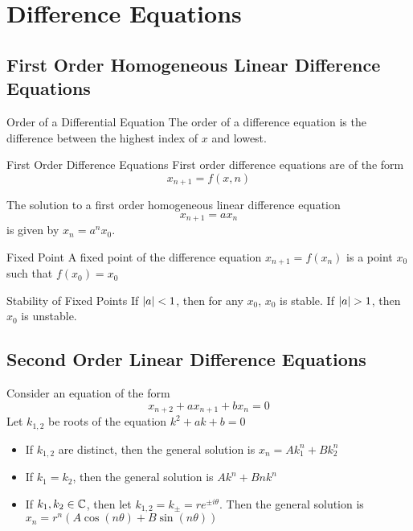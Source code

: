 \documentclass[a4paper]{article}
\begin{document}
\pagebreak
\section{Difference Equations}
\subsection{First Order Homogeneous Linear Difference Equations}
\begin{defn}{Order of a Differential Equation}{} The order of a difference equation is the difference between the highest index of $x$ and lowest. 
\end{defn}

\begin{defn}{First Order Difference Equations}{} First order difference equations are of the form $$x_{n+1}=f(x,n)$$
\end{defn}

\begin{thm}{}{} The solution to a first order homogeneous linear difference equation $$x_{n+1}=ax_n$$ is given by $x_n=a^nx_0$. 
\end{thm}

\begin{defn}{Fixed Point}{} A fixed point of the difference equation $x_{n+1}=f(x_n)$ is a point $x_0$ such that $f(x_0)=x_0$
\end{defn}

\begin{prp}{Stability of Fixed Points}{} If $\abs{a}<1$, then for any $x_0$, $x_0$ is stable. If $\abs{a}>1$, then $x_0$ is unstable. 
\end{prp}

\subsection{Second Order Linear Difference Equations}
\begin{thm}{}{} Consider an equation of the form $$x_{n+2}+ax_{n+1}+bx_n=0$$ Let $k_{1,2}$ be roots of the equation $k^2+ak+b=0$
\begin{itemize}
\item If $k_{1,2}$ are distinct, then the general solution is $x_n=Ak_1^n+Bk_2^n$
\item If $k_1=k_2$, then the general solution is $Ak^n+Bnk^n$
\item If $k_1,k_2\in\mathbb{C}$, then let $k_{1,2}=k_{\pm}=re^{\pm i\theta}$. Then the general solution is $x_n=r^n(A\cos(n\theta)+B\sin(n\theta))$
\end{itemize}
\end{thm}
\end{document}

